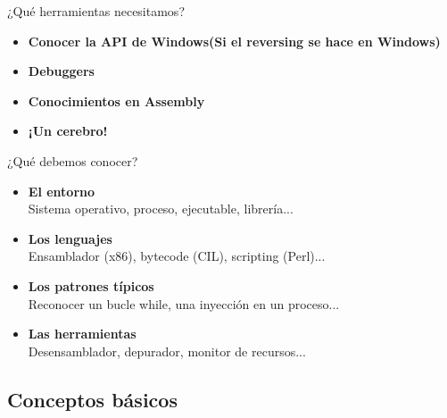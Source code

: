\documentclass{beamer}
\begin{document}
\begin{frame}{¿Qué herramientas necesitamos?}
\begin{itemize}
\item \textbf{Conocer la API de Windows(Si el reversing se hace en Windows)}
\item \textbf{Debuggers}
\item \textbf{Conocimientos en Assembly}
\item \textbf{¡Un cerebro!}
\end{itemize}

\end{frame}

\begin{frame}{¿Qué debemos conocer?}
\begin{itemize}
\item \textbf{El entorno} \\ \hspace{4ex}Sistema operativo, proceso, ejecutable, librería...
\item \textbf{Los lenguajes} \\ \hspace{4ex}Ensamblador (x86), bytecode (CIL), scripting (Perl)...
\item \textbf{Los patrones típicos} \\ \hspace{4ex}Reconocer un bucle while, una inyección en un proceso...
\item \textbf{Las herramientas} \\ \hspace{4ex}Desensamblador, depurador, monitor de recursos...
\end{itemize}

\end{frame}



\subsection{Conceptos básicos}
\end{document}
